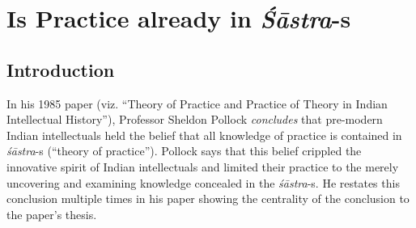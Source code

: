 \chapter{Is Practice already in {{\sl\bfseries Śāstra}\relax}-s}\label{chapter3}
\vskip -10pt


\vskip -10pt



\section*{Introduction}

In his 1985 paper (viz. ``Theory of Practice and Practice of Theory in Indian Intellectual History''), Professor Sheldon Pollock {\sl concludes} that pre-modern Indian intellectuals held the belief that all knowledge of practice is contained in {\sl śāstra}-s (``theory  of practice'').  Pollock says that this belief crippled the innovative spirit of Indian intellectuals and limited their practice to the merely uncovering and examining knowledge concealed in the {\sl śāstra}-s. He restates this conclusion multiple times in his paper showing the centrality of the conclusion to the paper's thesis. 

